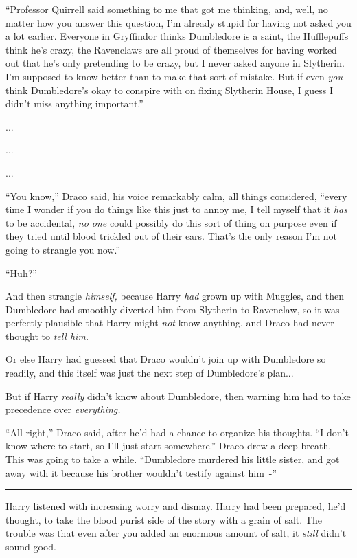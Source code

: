 ``Professor Quirrell said something to me that got me thinking, and, well, no matter how you answer this question, I'm already stupid for having not asked you a lot earlier. Everyone in Gryffindor thinks Dumbledore is a saint, the Hufflepuffs think he's crazy, the Ravenclaws are all proud of themselves for having worked out that he's only pretending to be crazy, but I never asked anyone in Slytherin. I'm supposed to know better than to make that sort of mistake. But if even \emph{you} think Dumbledore's okay to conspire with on fixing Slytherin House, I guess I didn't miss anything important.''

...

...

...

``You know,'' Draco said, his voice remarkably calm, all things considered, ``every time I wonder if you do things like this just to annoy me, I tell myself that it \emph{has} to be accidental, \emph{no one} could possibly do this sort of thing on purpose even if they tried until blood trickled out of their ears. That's the only reason I'm not going to strangle you now.''

``Huh?''

And then strangle \emph{himself,} because Harry \emph{had} grown up with Muggles, and then Dumbledore had smoothly diverted him from Slytherin to Ravenclaw, so it was perfectly plausible that Harry might \emph{not} know anything, and Draco had never thought to \emph{tell him.}

Or else Harry had guessed that Draco wouldn't join up with Dumbledore so readily, and this itself was just the next step of Dumbledore's plan...

But if Harry \emph{really} didn't know about Dumbledore, then warning him had to take precedence over \emph{everything.}

``All right,'' Draco said, after he'd had a chance to organize his thoughts. ``I don't know where to start, so I'll just start somewhere.'' Draco drew a deep breath. This was going to take a while. ``Dumbledore murdered his little sister, and got away with it because his brother wouldn't testify against him~-''

\begin{center}\rule{3in}{0.4pt}\end{center}

Harry listened with increasing worry and dismay. Harry had been prepared, he'd thought, to take the blood purist side of the story with a grain of salt. The trouble was that even after you added an enormous amount of salt, it \emph{still} didn't sound good.

